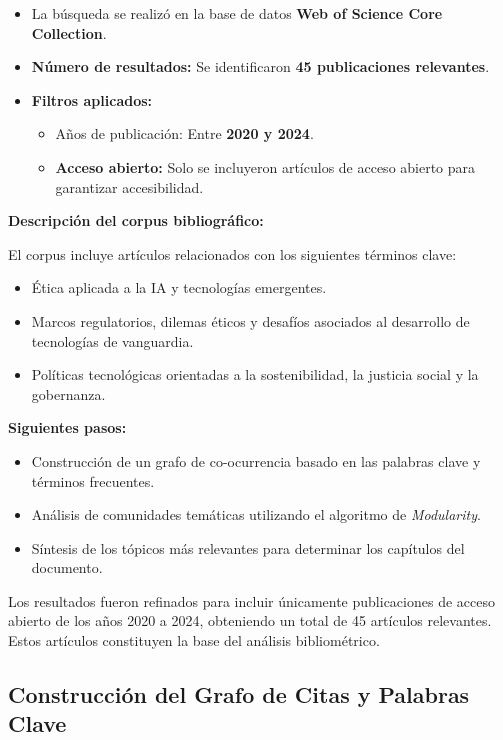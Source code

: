 \begin{refsection}
\begin{itemize}
    \item La búsqueda se realizó en la base de datos \textbf{Web of Science Core Collection}.
    \item \textbf{Número de resultados:} Se identificaron \textbf{45 publicaciones relevantes}.
    \item \textbf{Filtros aplicados:}
    \begin{itemize}
        \item Años de publicación: Entre \textbf{2020 y 2024}.
        \item \textbf{Acceso abierto:} Solo se incluyeron artículos de acceso abierto para garantizar accesibilidad.
    \end{itemize}
\end{itemize}

\textbf{Descripción del corpus bibliográfico:}

El corpus incluye artículos relacionados con los siguientes términos clave:
\begin{itemize}
    \item Ética aplicada a la IA y tecnologías emergentes.
    \item Marcos regulatorios, dilemas éticos y desafíos asociados al desarrollo de tecnologías de vanguardia.
    \item Políticas tecnológicas orientadas a la sostenibilidad, la justicia social y la gobernanza.
\end{itemize}

\textbf{Siguientes pasos:}
\begin{itemize}
    \item Construcción de un grafo de co-ocurrencia basado en las palabras clave y términos frecuentes.
    \item Análisis de comunidades temáticas utilizando el algoritmo de \textit{Modularity}.
    \item Síntesis de los tópicos más relevantes para determinar los capítulos del documento.
\end{itemize}


Los resultados fueron refinados para incluir únicamente publicaciones de acceso abierto de los años 2020 a 2024, obteniendo un total de 45 artículos relevantes. Estos artículos constituyen la base del análisis bibliométrico.

\subsection{Construcción del Grafo de Citas y Palabras Clave}


\end{refsection}
